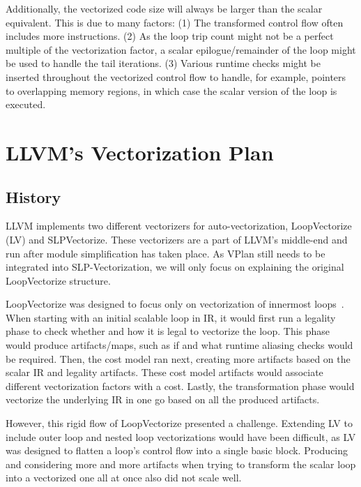 \documentclass[sigplan,11pt,nonacm]{acmart}
\begin{document}
Additionally, the vectorized code size will always be larger than the scalar equivalent. This is
due to many factors: (1) The transformed control flow often includes more instructions.
(2) As the loop trip count might not be a perfect multiple of the vectorization factor, a scalar
epilogue/remainder of the loop might be used to handle the tail iterations. (3) Various runtime
checks might be inserted throughout the vectorized control flow to handle, for example, pointers 
to overlapping memory regions, in which case the scalar version of the loop is executed.





\section{LLVM's Vectorization Plan}
\label{sec:vplan}

\subsection{History}
LLVM implements two different vectorizers for auto-vectorization, LoopVectorize (LV)
and SLPVectorize. These vectorizers are a part of LLVM's middle-end and run after module 
simplification has taken place. As VPlan still needs to be integrated into SLP-Vectorization, we 
will only focus on explaining the original LoopVectorize structure.

LoopVectorize was designed to focus only on vectorization of innermost loops~\cite{llvmintrvplan}. 
When starting with an initial scalable loop in IR, it would first run a legality phase to check 
whether  and how it is legal to vectorize the loop. This phase would produce artifacts/maps, such as if 
and what runtime aliasing checks would be required. Then, the cost model ran next, creating more 
artifacts based on the scalar IR and legality artifacts. These cost model artifacts would 
associate different vectorization factors with a cost. Lastly, the transformation phase would vectorize 
the underlying IR in one go based on all the produced artifacts.

However, this rigid flow of LoopVectorize presented a challenge. Extending LV to include outer loop 
and nested loop vectorizations would have been difficult, as LV was designed to flatten a
loop's control flow into a single basic block. Producing and considering more and 
more artifacts when trying to transform the scalar loop into a vectorized one all at once also did 
not scale well.
\end{document}
